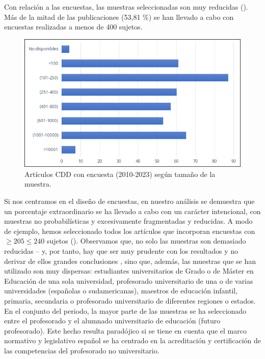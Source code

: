 \documentclass[spanish]{textolivre}
\begin{document}
Con relación a las encuestas, las muestras seleccionadas son muy reducidas (). Más de la mitad de las publicaciones (53,81 \%) se han llevado a cabo con encuestas realizadas a menos de 400 sujetos. 

\begin{figure}[h!]
    \centering
    \includegraphics[width=0.75\linewidth]{images/IMAGE13.png}
    \caption{ Artículos CDD con encuesta (2010-2023) según tamaño de la muestra.}
    \label{fig-13}
\end{figure}

Si nos centramos en el diseño de encuestas, en nuestro análisis se demuestra que un porcentaje extraordinario se ha llevado a cabo con un carácter intencional, con muestras no probabilísticas y excesivamente fragmentadas y reducidas. A modo de ejemplo, hemos seleccionado todos los artículos que incorporan encuestas con $\geq 205 \leq 240$ sujetos (). Observamos que, no solo las muestras son demasiado reducidas -- y, por tanto, hay que ser muy prudente con los resultados y no derivar de ellos grandes conclusiones \textendash, sino que, además, las muestras que se han utilizado son muy dispersas: estudiantes universitarios de Grado o de Máster en Educación de una sola universidad, profesorado universitario de una o de varias universidades (españolas o sudamericanas), maestros de educación infantil, primaria, secundaria o profesorado universitario de diferentes regiones o estados. En el conjunto del periodo, la mayor parte de las muestras se ha seleccionado entre el profesorado y el alumnado universitario de educación (futuro profesorado). Este hecho resulta paradójico si se tiene en cuenta que el marco normativo y legislativo español se ha centrado en la acreditación y certificación de las competencias del profesorado no universitario. 
\end{document}
